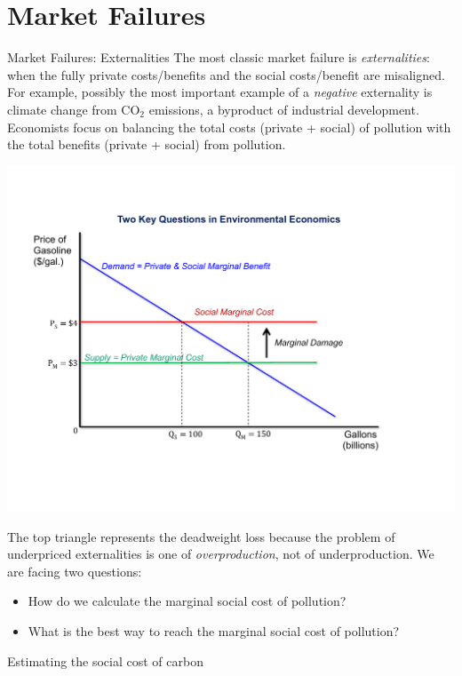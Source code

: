 \documentclass[8pt]{extarticle}
\begin{document}
  \section*{Market Failures}%
  \begin{problem}{Market Failures: Externalities}
    The most classic market failure is \textit{externalities}: when the fully private costs/benefits and the social costs/benefit are misaligned. For example, possibly the most important example of a \textit{negative} externality is climate change from CO$_2$ emissions, a byproduct of industrial development.\\

    Economists focus on balancing the total costs (private + social) of pollution with the total benefits (private + social) from pollution.
    \begin{center}
      \includegraphics[width=\textwidth]{climate_change_externalities.pdf}
    \end{center}
    The top triangle represents the deadweight loss because the problem of underpriced externalities is one of \textit{overproduction}, not of underproduction. We are facing two questions:
    \begin{itemize}
      \item How do we calculate the marginal social cost of pollution?
      \item What is the best way to reach the marginal social cost of pollution?
    \end{itemize}
    \begin{problem}{Estimating the social cost of carbon}
      \begin{description}

\end{description}
\end{problem}
\end{problem}
\end{document}
